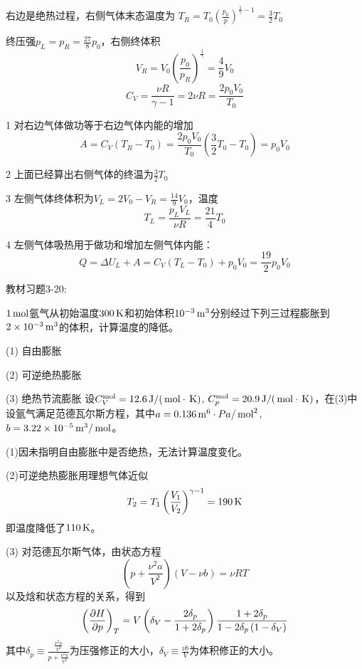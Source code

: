 \documentclass[CJK]{beamer}
\begin{document}
\begin{frame}
  \bch
  {\scriptsize
    右边是绝热过程，右侧气体末态温度为
    $T_R = T_0\left(\frac{p_0}{p}\right)^{\frac{1}{\gamma}-1} = \frac{3}{2}T_0$
    
    终压强$p_L=p_R=\frac{27}{8}p_0$，右侧终体积
    $$V_R = V_0\left(\frac{p_0}{p_R}\right)^{\frac{1}{\gamma}} = \frac{4}{9}V_0$$
    $$C_V = \frac{\nu R}{\gamma - 1} = 2 \nu R = \frac{2p_0V_0}{T_0}$$
  
    \bitem
  \item[1]{对右边气体做功等于右边气体内能的增加
    $$A = C_V(T_R-T_0) = \frac{2p_0V_0}{T_0}\left(\frac{3}{2}T_0-T_0\right) = p_0V_0$$}
  \item[2]{上面已经算出右侧气体的终温为$\frac{3}{2}T_0$}
  \item[3]{左侧气体终体积为$V_L=2V_0-V_R = \frac{14}{9}V_0$，温度
    $$T_L = \frac{p_LV_L}{\nu R} = \frac{21}{4}T_0$$}
  \item[4]{左侧气体吸热用于做功和增加左侧气体内能：
    $$ Q = \Delta U_L + A = C_V(T_L-T_0) + p_0V_0 = \frac{19}{2}p_0V_0$$}
    \eitem
  }
  \ech
\end{frame}

\begin{frame}
  \chtitle{\proid (\sthree)}
  \bch
  教材习题3-20:

  $1\,\mathrm{mol}$氩气从初始温度$300\,\mathrm{K}$和初始体积$10^{-3}\,\mathrm{m}^3$分别经过下列三过程膨胀到$2\times 10^{-3}\,\mathrm{m}^3$的体积，计算温度的降低。
  \bitem
\item[(1)]{自由膨胀}
\item[(2)]{可逆绝热膨胀}
\item[(3)]{绝热节流膨胀}
  \eitem
  设$C_V^{\rm mol} = 12.6\,\mathrm{J}/(\,\mathrm{mol}\cdot\,\mathrm{K})$, $C_p^{\rm mol} = 20.9\,\mathrm{J}/(\,\mathrm{mol}\cdot\,\mathrm{K})$，在(3)中设氩气满足范德瓦尔斯方程，其中$a = 0.136\,\mathrm{m}^6\cdot Pa/\,\mathrm{mol}^2$, $b =3.22\times 10^{-5}\,\mathrm{m}^3/\,\mathrm{mol}$。
  \ech
\end{frame}


\begin{frame}
  \bch
  {\scriptsize
    (1)因未指明自由膨胀中是否绝热，无法计算温度变化。
    
  (2)可逆绝热膨胀用理想气体近似
  $$T_2 = T_1 \left(\frac{V_1}{V_2}\right)^{\gamma-1} = 190 \,\mathrm{K} $$
    即温度降低了$110\,\mathrm{K}$。
    
  (3) 对范德瓦尔斯气体，由状态方程
$$\left(p + \frac{\nu^2 a}{V^2}\right) \left(V - \nu b\right) = \nu RT$$
以及焓和状态方程的关系，得到
$$\left(\frac{\partial H}{\partial p}\right)_{T} = V \left(\delta_V - \frac{2\delta_p}{1+2\delta_p}\right) \frac{1+2\delta_p}{1-2\delta_p\left(1-\delta_V\right)}$$
其中$\delta_p \equiv \frac{\frac{\nu^2a}{V^2}}{p+\frac{\nu^2 a}{V^2}}$为压强修正的大小，$\delta_V\equiv \frac{\nu b}{V}$为体积修正的大小。
  }
  \ech
\end{frame}
\end{document}
